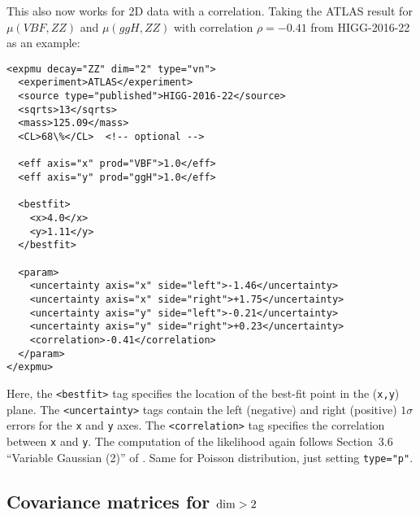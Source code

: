 This also now works for 2D data with a correlation.  
Taking the ATLAS result for $\mu(VBF, ZZ)$ and $\mu(ggH, ZZ)$ with correlation $\rho=-0.41$ from HIGG-2016-22 as an example:

\begin{verbatim}
<expmu decay="ZZ" dim="2" type="vn">
  <experiment>ATLAS</experiment>
  <source type="published">HIGG-2016-22</source>
  <sqrts>13</sqrts>
  <mass>125.09</mass>
  <CL>68\%</CL>  <!-- optional -->

  <eff axis="x" prod="VBF">1.0</eff>
  <eff axis="y" prod="ggH">1.0</eff>

  <bestfit>
    <x>4.0</x>
    <y>1.11</y>
  </bestfit>
 
  <param>
    <uncertainty axis="x" side="left">-1.46</uncertainty>
    <uncertainty axis="x" side="right">+1.75</uncertainty>
    <uncertainty axis="y" side="left">-0.21</uncertainty>
    <uncertainty axis="y" side="right">+0.23</uncertainty>
    <correlation>-0.41</correlation>
  </param>
</expmu>
\end{verbatim}

\noindent
Here, the {\tt <bestfit>} tag specifies the location of the best-fit point in the ({\tt x,y}) plane. 
The {\tt <uncertainty>} tags contain the left (negative) and right (positive) $1\sigma$ errors for the {\tt x} and {\tt y} axes. 
The {\tt <correlation>} tag specifies the correlation between {\tt x} and {\tt y}. 
The computation of the likelihood again follows Section~3.6 ``Variable Gaussian (2)'' of \cite{Barlow:2004wg}. 
Same for Poisson distribution, just setting {\tt type="p"}.

\subsection{Covariance matrices for ${\rm dim}>2$}

